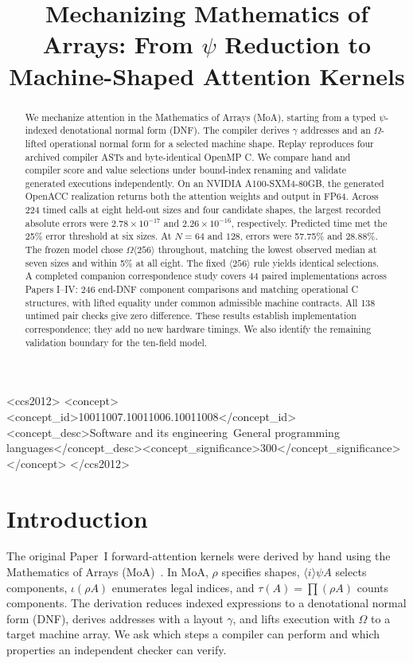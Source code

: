 \documentclass[sigplan,10pt,review,anonymous,balance=false,pbalance=false]{acmart}
\title{Mechanizing Mathematics of Arrays: From \texorpdfstring{$\psi$}{Psi} Reduction to Machine-Shaped Attention Kernels}
\begin{document}
\begin{abstract}
We mechanize attention in the Mathematics of Arrays (MoA), starting from a typed $\psi$-indexed denotational normal form (DNF). The compiler derives $\gamma$ addresses and an $\Omega$-lifted operational normal form for a selected machine shape. Replay reproduces four archived compiler ASTs and byte-identical OpenMP C. We compare hand and compiler score and value selections under bound-index renaming and validate generated executions independently. On an NVIDIA A100-SXM4-80GB, the generated OpenACC realization returns both the attention weights and output in FP64. Across 224 timed calls at eight held-out sizes and four candidate shapes, the largest recorded absolute errors were $2.78\times10^{-17}$ and $2.26\times10^{-16}$, respectively. Predicted time met the 25\% error threshold at six sizes. At $N=64$ and $128$, errors were 57.75\% and 28.88\%. The frozen model chose $\Omega\langle256\rangle$ throughout, matching the lowest observed median at seven sizes and within 5\% at all eight. The fixed $\langle256\rangle$ rule yields identical selections. A completed companion correspondence study covers 44 paired implementations across Papers I--IV: 246 end-DNF component comparisons and matching operational C structures, with lifted equality under common admissible machine contracts. All 138 untimed pair checks give zero difference. These results establish implementation correspondence; they add no new hardware timings. We also identify the remaining validation boundary for the ten-field model.
\end{abstract}
\begin{CCSXML}
<ccs2012>
 <concept><concept_id>10011007.10011006.10011008</concept_id><concept_desc>Software and its engineering~General programming languages</concept_desc><concept_significance>300</concept_significance></concept>
</ccs2012>
\end{CCSXML}
\maketitle
\thispagestyle{plain}
\pagestyle{plain}
\section{Introduction}
The original Paper~I forward-attention kernels were derived by hand using the Mathematics of Arrays (MoA)~\cite{paperI,moa}. In MoA, $\rho$ specifies shapes, $\langle i\rangle\psi A$ selects components, $\iota(\rho A)$ enumerates legal indices, and $\tau(A)=\prod(\rho A)$ counts components. The derivation reduces indexed expressions to a denotational normal form (DNF), derives addresses with a layout $\gamma$, and lifts execution with $\Omega$ to a target machine array. We ask which steps a compiler can perform and which properties an independent checker can verify.
\end{document}
